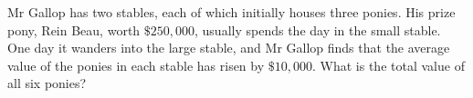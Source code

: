 Mr Gallop has two stables, each of which initially houses three ponies. His prize pony, Rein Beau, worth $\$250{,}000$, usually spends the day in the small stable. One day it wanders into the large stable, and Mr Gallop finds that the average value of the ponies in each stable has risen by $\$10{,}000$. What is the total value of all six ponies?
